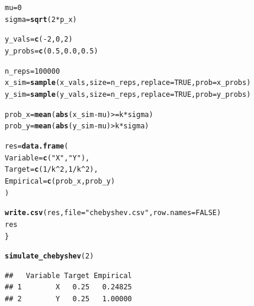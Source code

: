 \documentclass[12pt,a4paper]{article}\usepackage[]{graphicx}\usepackage[]{xcolor}
\makeatletter
\newcommand{\hlnum}[1]{\textcolor[rgb]{0.686,0.059,0.569}{#1}}%
\newcommand{\hlsng}[1]{\textcolor[rgb]{0.192,0.494,0.8}{#1}}%
\newcommand{\hlopt}[1]{\textcolor[rgb]{0,0,0}{#1}}%
\newcommand{\hldef}[1]{\textcolor[rgb]{0.345,0.345,0.345}{#1}}%
\newcommand{\hlkwb}[1]{\textcolor[rgb]{0.69,0.353,0.396}{#1}}%
\newcommand{\hlkwc}[1]{\textcolor[rgb]{0.333,0.667,0.333}{#1}}%
\newcommand{\hlkwd}[1]{\textcolor[rgb]{0.737,0.353,0.396}{\textbf{#1}}}%
\newenvironment{kframe}{%
 \def\at@end@of@kframe{}%
 \ifinner\ifhmode%
  \def\at@end@of@kframe{\end{minipage}}%
  \begin{minipage}{\columnwidth}%
 \fi\fi%
 \def\FrameCommand##1{\hskip\@totalleftmargin \hskip-\fboxsep
 \colorbox{shadecolor}{##1}\hskip-\fboxsep
     \hskip-\linewidth \hskip-\@totalleftmargin \hskip\columnwidth}%
 \MakeFramed {\advance\hsize-\width
   \@totalleftmargin\z@ \linewidth\hsize
   \@setminipage}}%
 {\par\unskip\endMakeFramed%
 \at@end@of@kframe}
\newenvironment{knitrout}{}{} %
\makeatother
\begin{document}
\begin{enumerate}[label=\arabic*.]
\begin{enumerate}[label=(\alph*)]
\begin{knitrout}
\begin{kframe}
\begin{alltt}
  \hldef{mu} \hlkwb{=} \hlnum{0}
  \hldef{sigma} \hlkwb{=} \hlkwd{sqrt}\hldef{(}\hlnum{2}\hlopt{*}\hldef{p_x)}

  \hldef{y_vals} \hlkwb{=} \hlkwd{c}\hldef{(}\hlopt{-}\hlnum{2}\hldef{,} \hlnum{0}\hldef{,} \hlnum{2}\hldef{)}
  \hldef{y_probs} \hlkwb{=} \hlkwd{c}\hldef{(}\hlnum{0.5}\hldef{,} \hlnum{0.0}\hldef{,} \hlnum{0.5}\hldef{)}

  \hldef{n_reps} \hlkwb{=} \hlnum{100000}
  \hldef{x_sim} \hlkwb{=} \hlkwd{sample}\hldef{(x_vals,} \hlkwc{size} \hldef{= n_reps,} \hlkwc{replace} \hldef{=} \hlnum{TRUE}\hldef{,} \hlkwc{prob} \hldef{= x_probs)}
  \hldef{y_sim} \hlkwb{=} \hlkwd{sample}\hldef{(y_vals,} \hlkwc{size} \hldef{= n_reps,} \hlkwc{replace} \hldef{=} \hlnum{TRUE}\hldef{,} \hlkwc{prob} \hldef{= y_probs)}

  \hldef{prob_x} \hlkwb{=} \hlkwd{mean}\hldef{(}\hlkwd{abs}\hldef{(x_sim} \hlopt{-} \hldef{mu)} \hlopt{>=} \hldef{k}\hlopt{*}\hldef{sigma)}
  \hldef{prob_y} \hlkwb{=} \hlkwd{mean}\hldef{(}\hlkwd{abs}\hldef{(y_sim} \hlopt{-} \hldef{mu)} \hlopt{>} \hldef{k}\hlopt{*}\hldef{sigma)}

  \hldef{res} \hlkwb{=} \hlkwd{data.frame}\hldef{(}
    \hlkwc{Variable} \hldef{=} \hlkwd{c}\hldef{(}\hlsng{"X"}\hldef{,} \hlsng{"Y"}\hldef{),}
    \hlkwc{Target} \hldef{=} \hlkwd{c}\hldef{(}\hlnum{1}\hlopt{/}\hldef{k}\hlopt{^}\hlnum{2}\hldef{,} \hlnum{1}\hlopt{/}\hldef{k}\hlopt{^}\hlnum{2}\hldef{),}
    \hlkwc{Empirical} \hldef{=} \hlkwd{c}\hldef{(prob_x, prob_y)}
  \hldef{)}

  \hlkwd{write.csv}\hldef{(res,} \hlkwc{file} \hldef{=} \hlsng{"chebyshev.csv"}\hldef{,} \hlkwc{row.names} \hldef{=} \hlnum{FALSE}\hldef{)}
  \hldef{res}
\hldef{\}}

\hlkwd{simulate_chebyshev}\hldef{(}\hlnum{2}\hldef{)}
\end{alltt}
\begin{verbatim}
##   Variable Target Empirical
## 1        X   0.25   0.24825
## 2        Y   0.25   1.00000
\end{verbatim}
\end{kframe}
\end{knitrout}
		\end{enumerate}
\end{enumerate}
\end{document}

